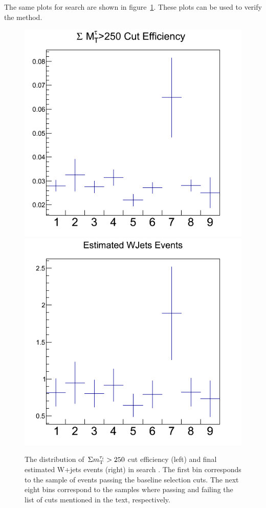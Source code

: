 The same plots for search \bintwo are shown in figure~\ref{fig:wjets_2}. These plots can be used to verify the method. 
\begin{figure}[iHhtb]
\centering
\includegraphics[angle=0,scale=0.35]{TauTauFigs/eff_bin2.png}
\includegraphics[angle=0,scale=0.35]{TauTauFigs/est_bin2.png} \\
\caption{The distribution of $\,\Sigma m_{\rm T}^{\tau_i}>250$ cut 
efficiency (left) and final estimated W+jets events (right) in search \bintwo.
 The first bin corresponds to the sample of events passing the baseline selection cuts. 
The next eight bins correspond to the samples where passing and failing the 
list of cuts mentioned in the text, respectively.}
\label{fig:wjets_2}
\end{figure}

